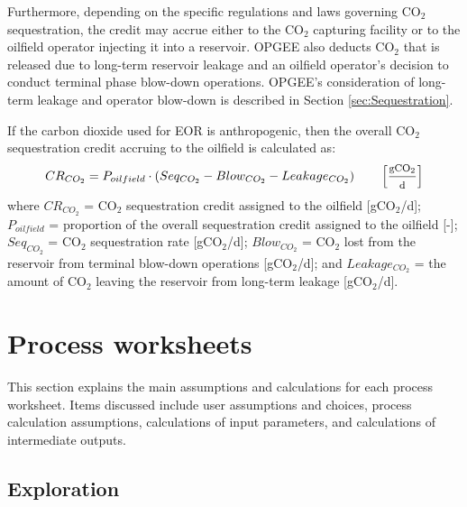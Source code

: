 \documentclass[11pt]{report}
\newcommand{\marg}[1]{{\footnotesize\textit{\textcolor{stanford}{'#1'}}}}
\newcommand{\marginnote}[1]{\marginpar{\marg{#1}}}
\begin{document}
Furthermore, depending on the specific regulations and laws governing CO$_2$ sequestration, the credit may accrue either to the CO$_2$ capturing facility or to the oilfield operator injecting it into a reservoir. OPGEE also deducts CO$_2$ that is released due to long-term reservoir leakage and an oilfield operator's decision to conduct terminal phase blow-down operations. OPGEE's consideration of long-term leakage and operator blow-down is described in Section \ref{sec:Sequestration}\marginnote{Production \& Extraction 1.2.9.2, 1.2.9.3}.

If the carbon dioxide used for EOR is anthropogenic, then the overall CO$_2$ sequestration credit accruing to the oilfield is calculated as:
\begin{equation} \label{eq:SequestrationCredit}
CR_{CO_{2}} = P_{oilfield} \cdot (Seq_{CO_{2}} - Blow_{CO_{2}} - Leakage_{CO_{2}}) \quad \quad \begin{footnotesize}\left[ \frac{\text{gCO$_2$}}{\text{d}} \right] \end{footnotesize}
\end{equation}
 where $CR_{CO_{2}}$ = CO$_2$ sequestration credit assigned to the oilfield [gCO$_2$/d]; $P_{oilfield}$ = proportion of the overall sequestration credit assigned to the oilfield [-]; $Seq_{CO_{2}}$ = CO$_2$ sequestration rate [gCO$_2$/d]; $Blow_{CO_{2}}$ = CO$_2$ lost from the reservoir from terminal blow-down operations [gCO$_2$/d]; and $Leakage_{CO_{2}}$ = the amount of CO$_2$ leaving the reservoir from long-term leakage [gCO$_2$/d].





\chapter{Process worksheets}

This section explains the main assumptions and calculations for each process worksheet. Items discussed include user assumptions and choices, process calculation assumptions, calculations of input parameters, and calculations of intermediate outputs.


\clearpage
\section{Exploration}\label{sec:exploration}
\end{document}
